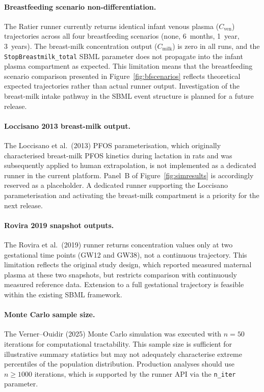 \documentclass[preprint,12pt]{elsarticle}
\begin{document}
\begin{linenumbers}
\paragraph{Breastfeeding scenario non-differentiation.}
The Ratier runner currently returns identical infant venous plasma ($C_\mathrm{ven}$) trajectories across all four breastfeeding scenarios (none, 6~months, 1~year, 3~years). The breast-milk concentration output ($C_\mathrm{milk}$) is zero in all runs, and the \texttt{StopBreastmilk\_total} SBML parameter does not propagate into the infant plasma compartment as expected. This limitation means that the breastfeeding scenario comparison presented in Figure~\ref{fig:bfscenarios} reflects theoretical expected trajectories rather than actual runner output. Investigation of the breast-milk intake pathway in the SBML event structure is planned for a future release.

\paragraph{Loccisano 2013 breast-milk output.}
The Loccisano et al.\ (2013) PFOS parameterisation, which originally characterised breast-milk PFOS kinetics during lactation in rats and was subsequently applied to human extrapolation, is not implemented as a dedicated runner in the current platform. Panel~B of Figure~\ref{fig:simresults} is accordingly reserved as a placeholder. A dedicated runner supporting the Loccisano parameterisation and activating the breast-milk compartment is a priority for the next release.

\paragraph{Rovira 2019 snapshot outputs.}
The Rovira et al.\ (2019) runner returns concentration values only at two gestational time points (GW12 and GW38), not a continuous trajectory. This limitation reflects the original study design, which reported measured maternal plasma at these two snapshots, but restricts comparison with continuously measured reference data. Extension to a full gestational trajectory is feasible within the existing SBML framework.

\paragraph{Monte Carlo sample size.}
The Verner--Ouidir (2025) Monte Carlo simulation was executed with $n=50$ iterations for computational tractability. This sample size is sufficient for illustrative summary statistics but may not adequately characterise extreme percentiles of the population distribution. Production analyses should use $n \geq 1000$ iterations, which is supported by the runner API via the \texttt{n\_iter} parameter.


\end{linenumbers}
\end{document}
